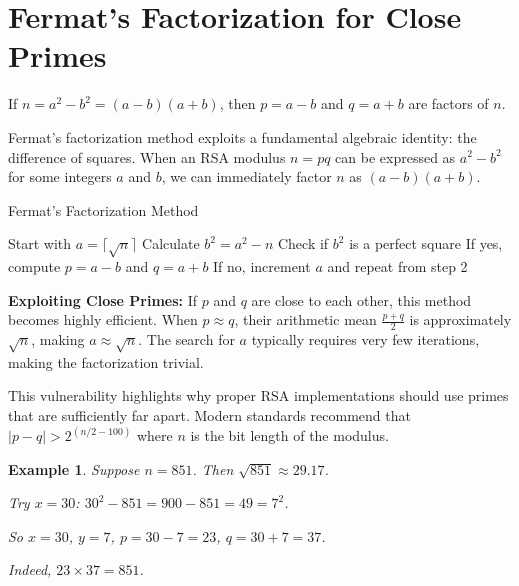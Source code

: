 \documentclass{article}
\newtheorem{example}{Example}
\begin{document}
\section{Fermat's Factorization for Close Primes}

\begin{definitionbox}[title=Fermat's Factorization]
    If $n = a^2 - b^2 = (a - b)(a + b)$, then $p = a - b$ and $q = a + b$ are factors of $n$.
\end{definitionbox}

Fermat's factorization method exploits a fundamental algebraic identity: the difference of squares. When an RSA modulus $n = pq$ can be expressed as $a^2 - b^2$ for some integers $a$ and $b$, we can immediately factor $n$ as $(a-b)(a+b)$.
\newline

\begin{algorithm}
    \caption{Fermat's Factorization Method}
    \begin{algorithmic}[1]
        \State Start with $a = \lceil\sqrt{n}\rceil$
        \State Calculate $b^2 = a^2 - n$
        \State Check if $b^2$ is a perfect square
        \State If yes, compute $p = a - b$ and $q = a + b$
        \State If no, increment $a$ and repeat from step 2
    \end{algorithmic}
\end{algorithm}

\textbf{Exploiting Close Primes:} If $p$ and $q$ are close to each other, this method becomes highly efficient. When $p \approx q$, their arithmetic mean $\frac{p+q}{2}$ is approximately $\sqrt{n}$, making $a \approx \sqrt{n}$. The search for $a$ typically requires very few iterations, making the factorization trivial.

This vulnerability highlights why proper RSA implementations should use primes that are sufficiently far apart. Modern standards recommend that $|p-q| > 2^{(n/2-100)}$ where $n$ is the bit length of the modulus.

\begin{example}
    Suppose $n = 851$. Then $\sqrt{851} \approx 29.17$.

    Try $x = 30$: $30^2 - 851 = 900 - 851 = 49 = 7^2$.

    So $x = 30$, $y = 7$, $p = 30 - 7 = 23$, $q = 30 + 7 = 37$.

    Indeed, $23 \times 37 = 851$.
\end{example}


\end{document}

